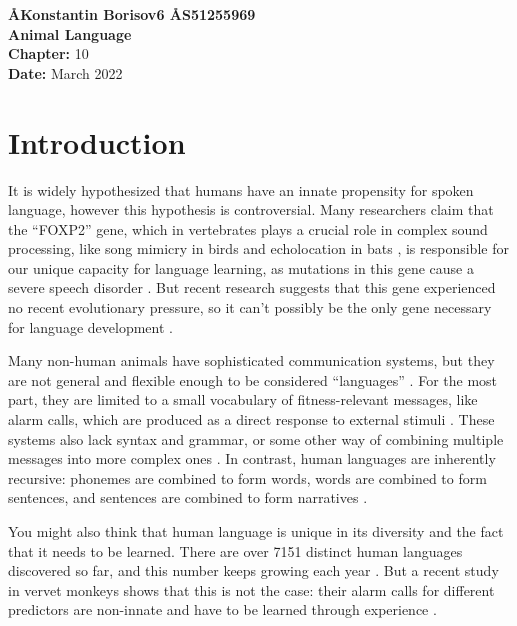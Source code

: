 \documentclass[a4paper,11pt]{article}
\begin{document}
  \begin{singlespace}
    \large
    {\bf \AA{Konstantin Borisov}{6} \AA{S5125596}{9}} \\[12pt]
    {\huge\bf Animal Language} \\[6pt]
    \textbf{Chapter:} 10 \\
    \textbf{Date:} March 2022
  \end{singlespace}
  \vspace{-\parskip}

  \section{Introduction}
  It is widely hypothesized that humans have an innate propensity for spoken language,
  however this hypothesis is controversial.
  Many researchers claim that the ``FOXP2'' gene,
  which in vertebrates plays a crucial role in complex sound processing,
  like song mimicry in birds and echolocation in bats \cite{campbell2009conservation},
  is responsible for our unique capacity for language learning,
  as mutations in this gene cause a severe speech disorder \cite{thebook2}.
  But recent research suggests that this gene experienced no recent evolutionary pressure,
  so it can't possibly be the only gene necessary for language development \cite{atkinson2018no}.

  Many non-human animals have sophisticated communication systems,
  but they are not general and flexible enough to be considered ``languages'' \cite{thebook2}.
  For the most part, they are limited to a small vocabulary of fitness-relevant messages,
  like alarm calls, which are produced as a direct response to external stimuli \cite{fitch2020animalcognition}.
  These systems also lack syntax and grammar,
  or some other way of combining multiple messages into more complex ones \cite{thebook2}.
  In contrast, human languages are inherently recursive:
  phonemes are combined to form words, words are combined to form sentences,
  and sentences are combined to form narratives \cite{bowling2015animal}.

  You might also think that human language is unique in its diversity and the fact that it needs to be learned.
  There are over 7151 distinct human languages discovered so far, and this number keeps growing each year \cite{ethnologue}.
  But a recent study in vervet monkeys shows that this is not the case:
  their alarm calls for different predictors are non-innate and have to be learned through experience \cite{liska1993bee}.
\end{document}
